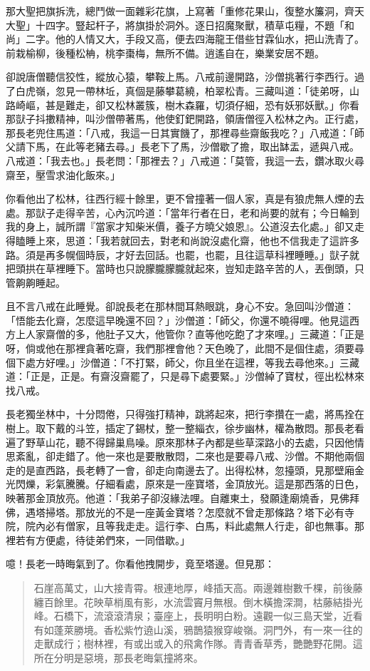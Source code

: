 那大聖把旗拆洗，總鬥做一面雜彩花旗，上寫著「重修花果山，復整水簾洞，齊天大聖」十四字。豎起杆子，將旗掛於洞外。逐日招魔聚獸，積草屯糧，不題「和尚」二字。他的人情又大，手段又高，便去四海龍王借些甘霖仙水，把山洗青了。前栽榆柳，後種松柟，桃李棗梅，無所不備。逍遙自在，樂業安居不題。

卻說唐僧聽信狡性，縱放心猿，攀鞍上馬。八戒前邊開路，沙僧挑著行李西行。過了白虎嶺，忽見一帶林坵，真個是藤攀葛繞，柏翠松青。三藏叫道：「徒弟呀，山路崎嶇，甚是難走，卻又松林叢簇，樹木森羅，切須仔細，恐有妖邪妖獸。」你看那獃子抖擻精神，叫沙僧帶著馬，他使釘鈀開路，領唐僧徑入松林之內。正行處，那長老兜住馬道：「八戒，我這一日其實饑了，那裡尋些齋飯我吃？」八戒道：「師父請下馬，在此等老豬去尋。」長老下了馬，沙僧歇了擔，取出缽盂，遞與八戒。八戒道：「我去也。」長老問：「那裡去？」八戒道：「莫管，我這一去，鑽冰取火尋齋至，壓雪求油化飯來。」

你看他出了松林，往西行經十餘里，更不曾撞著一個人家，真是有狼虎無人煙的去處。那獃子走得辛苦，心內沉吟道：「當年行者在日，老和尚要的就有；今日輪到我的身上，誠所謂『當家才知柴米價，養子方曉父娘恩』。公道沒去化處。」卻又走得瞌睡上來，思道：「我若就回去，對老和尚說沒處化齋，他也不信我走了這許多路。須是再多幌個時辰，才好去回話。也罷，也罷，且往這草科裡睡睡。」獃子就把頭拱在草裡睡下。當時也只說朦朧朦朧就起來，豈知走路辛苦的人，丟倒頭，只管齁齁睡起。

且不言八戒在此睡覺。卻說長老在那林間耳熱眼跳，身心不安。急回叫沙僧道：「悟能去化齋，怎麼這早晚還不回？」沙僧道：「師父，你還不曉得哩。他見這西方上人家齋僧的多，他肚子又大，他管你？直等他吃飽了才來哩。」三藏道：「正是呀，倘或他在那裡貪著吃齋，我們那裡會他？天色晚了，此間不是個住處，須要尋個下處方好哩。」沙僧道：「不打緊，師父，你且坐在這裡，等我去尋他來。」三藏道：「正是，正是。有齋沒齋罷了，只是尋下處要緊。」沙僧綽了寶杖，徑出松林來找八戒。

長老獨坐林中，十分悶倦，只得強打精神，跳將起來，把行李攢在一處，將馬拴在樹上。取下戴的斗笠，插定了錫杖，整一整緇衣，徐步幽林，權為散悶。那長老看遍了野草山花，聽不得歸巢鳥噪。原來那林子內都是些草深路小的去處，只因他情思紊亂，卻走錯了。他一來也是要散散悶，二來也是要尋八戒、沙僧。不期他兩個走的是直西路，長老轉了一會，卻走向南邊去了。出得松林，忽擡頭，見那壁廂金光閃爍，彩氣騰騰。仔細看處，原來是一座寶塔，金頂放光。這是那西落的日色，映著那金頂放亮。他道：「我弟子卻沒緣法哩。自離東土，發願逢廟燒香，見佛拜佛，遇塔掃塔。那放光的不是一座黃金寶塔？怎麼就不曾走那條路？塔下必有寺院，院內必有僧家，且等我走走。這行李、白馬，料此處無人行走，卻也無事。那裡若有方便處，待徒弟們來，一同借歇。」

噫！長老一時晦氣到了。你看他拽開步，竟至塔邊。但見那：
\begin{quote}
石崖高萬丈，山大接青霄。根連地厚，峰插天高。兩邊雜樹數千棵，前後藤纏百餘里。花映草梢風有影，水流雲竇月無根。倒木橫擔深澗，枯藤結掛光峰。石橋下，流滾滾清泉；臺座上，長明明白粉。遠觀一似三島天堂，近看有如蓬萊勝境。香松紫竹遶山溪，鴉鵲猿猴穿峻嶺。洞門外，有一來一往的走獸成行；樹林裡，有或出或入的飛禽作隊。青青香草秀，艷艷野花開。這所在分明是惡境，那長老晦氣撞將來。
\end{quote}

